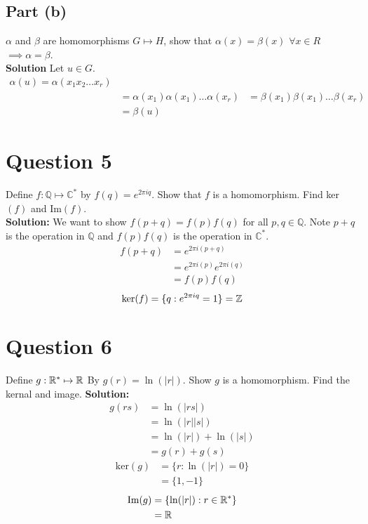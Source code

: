 \documentclass[openany]{report}
\begin{document}
\subsection{Part (b)}
$\alpha$ and $\beta$ are homomorphisms $G \mapsto H$, show that $\alpha(x) = \beta(x)$ $\forall  x \in R$ $\implies \alpha = \beta$. \\[2ex]
\textbf{Solution}
Let $u \in G$. 
\begin{align*}
    \alpha(u) = \alpha(x_1x_2\ldots x_r)\\
    &= \alpha(x_1)\alpha(x_1)\ldots\alpha(x_r)
    &= \beta(x_1)\beta(x_1)\ldots\beta(x_r)\\
    &= \beta(u)
\end{align*}
 
\section{Question 5}
Define $f: \mathbb{Q} \mapsto \mathbb{C}^*$ by $f(q) = e^{2\pi iq}$. Show that $f$ is a homomorphism. Find ker$(f)$ and Im$(f)$.  \\[2ex]

\textbf{Solution:} We want to show $f(p + q) = f(p)f(q)$ for all $p,q \in \mathbb{Q}$. Note $p+q$ is the operation in $\mathbb{Q}$ and $f(p)f(q)$ is the operation in $\mathbb{C}^*$.
\begin{align*}
    f(p+q) &= e^{2\pi i(p+q)}\\
    &= e^{2\pi i(p)}e^{2\pi i(q)}\\
    &= f(p)f(q)
\end{align*}
\[\text{ker}(f) = \{q: e^{2 \pi i q} = 1\} = \mathbb{Z}\]
\section{Question 6}
Define $g: \mathbb{R}^* \mapsto \mathbb{R}$ By $g(r) = \ln(|r|)$. Show $g$ is a homomorphism. Find the kernal and image.
\textbf{Solution:}
\begin{align*}
    g(rs) &= \ln(|rs|)\\
    &= \ln(|r||s|)\\
    &= \ln(|r|) + \ln(|s|)\\
    &= g(r) + g(s)
\end{align*}
\begin{align*}
    \text{ker}(g) &= \{r: \ln(|r|) = 0\}\\
    &= \{1, -1\}
\end{align*}
\begin{align*}
    \text{Im}(g) &= \{\ln(|r|) : r \in \mathbb{R}^*\}\\
    &= \mathbb{R}
\end{align*}
 
\end{document}
